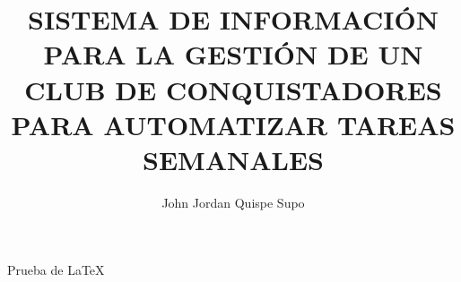 \documentclass[man, floatsintext]{apa7}
\title{SISTEMA DE INFORMACIÓN PARA LA GESTIÓN DE UN CLUB DE CONQUISTADORES PARA AUTOMATIZAR TAREAS SEMANALES}
\author{John Jordan Quispe Supo}
\affiliation{Instituto de Educación Superior Privado del Sur}
\begin{document}
    \maketitle

Prueba de LaTeX

    
    
\end{document}
